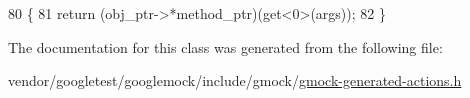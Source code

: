 \begin{DoxyCode}
80                                                       \{
81            \textcolor{keywordflow}{return} (obj\_ptr->*method\_ptr)(get<0>(args));
82   \}
\end{DoxyCode}


The documentation for this class was generated from the following file\+:\begin{DoxyCompactItemize}
\item 
vendor/googletest/googlemock/include/gmock/\hyperlink{gmock-generated-actions_8h}{gmock-\/generated-\/actions.\+h}\end{DoxyCompactItemize}
